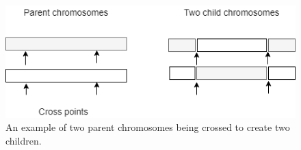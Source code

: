 \begin{figure}[h]
	\centering
	\includegraphics[width=0.7\linewidth]{theory/GeneticAlgoCrossover.png}
	\caption{An example of two parent chromosomes being crossed to create two children.}
	\label{fig:geneticalgocrossover}
\end{figure}


